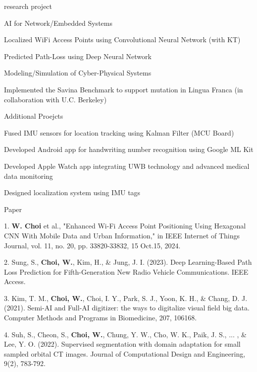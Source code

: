 \documentclass[
	11pt, %
]{resume} %
\begin{document}
\begin{rSection}{research project}
	\begin{rSubsection}{AI for Network/Embedded Systems}{}{}{}
		\item Localized WiFi Access Points using Convolutional Neural Network (with KT)
		\item Predicted Path-Loss using Deep Neural Network
	\end{rSubsection}

	\begin{rSubsection}{Modeling/Simulation of Cyber-Physical Systems}{}{}{}
		\item Implemented the Savina Benchmark to support mutation in Lingua Franca (in collaboration with U.C. Berkeley)
	\end{rSubsection}

	
	\begin{rSubsection}{Additional Proejcts}{}{}{}
		\item Fused IMU sensors for location tracking using Kalman Filter (MCU Board)
		\item Developed Android app for handwriting number recognition using Google ML Kit
		\item Developed Apple Watch app integrating UWB technology and advanced medical data monitoring
		\item Designed localization system using IMU tags
	\end{rSubsection}
\end{rSection}



\begin{rSection}{Paper}

	1. \textbf{W. Choi} et al., "Enhanced Wi-Fi Access Point Positioning Using Hexagonal CNN With Mobile Data and Urban Information," in IEEE Internet of Things Journal, vol. 11, no. 20, pp. 33820-33832, 15 Oct.15, 2024.

	2. Sung, S., \textbf{Choi, W.}, Kim, H., \& Jung, J. I. (2023). Deep Learning-Based Path Loss Prediction for Fifth-Generation New Radio Vehicle Communications. IEEE Access.
	
	3. Kim, T. M., \textbf{Choi, W.}, Choi, I. Y., Park, S. J., Yoon, K. H., \& Chang, D. J. (2021). Semi-AI and Full-AI digitizer: the ways to digitalize visual field big data. Computer Methods and Programs in Biomedicine, 207, 106168.

	4. Suh, S., Cheon, S., \textbf{Choi, W.}, Chung, Y. W., Cho, W. K., Paik, J. S., ... , \& Lee, Y. O. (2022). Supervised segmentation with domain adaptation for small sampled orbital CT images. Journal of Computational Design and Engineering, 9(2), 783-792.


\end{rSection}
\end{document}
